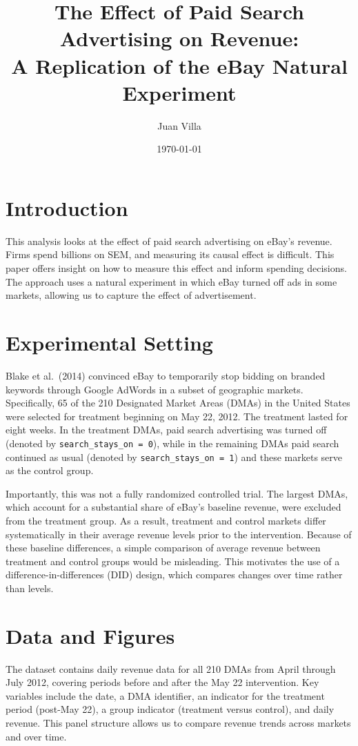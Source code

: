 \documentclass[12pt]{article}
\title{The Effect of Paid Search Advertising on Revenue: \\
A Replication of the eBay Natural Experiment}
\author{Juan Villa}
\date{\today}
\begin{document}
\maketitle

\section{Introduction}

This analysis looks at the effect of paid search advertising on eBay's revenue.
Firms spend billions on SEM, and measuring its causal effect is difficult. This paper offers insight on how to measure this effect and inform spending decisions. 
The approach uses a natural experiment in which eBay turned off ads in some markets, allowing us to capture the effect of advertisement.

\section{Experimental Setting}

Blake et al.\ (2014) convinced eBay to temporarily stop bidding on branded keywords through Google AdWords in a subset of geographic markets. Specifically, 65 of the 210 Designated Market Areas (DMAs) in the United States were selected for treatment beginning on May 22, 2012. The treatment lasted for eight weeks. In the treatment DMAs, paid search advertising was turned off (denoted by \texttt{search\_stays\_on = 0}), while in the remaining DMAs paid search continued as usual (denoted by \texttt{search\_stays\_on = 1}) and these markets serve as the control group.

Importantly, this was not a fully randomized controlled trial. The largest DMAs, which account for a substantial share of eBay's baseline revenue, were excluded from the treatment group. As a result, treatment and control markets differ systematically in their average revenue levels prior to the intervention. Because of these baseline differences, a simple comparison of average revenue between treatment and control groups would be misleading. This motivates the use of a difference-in-differences (DID) design, which compares changes over time rather than levels.

\section{Data and Figures}

The dataset contains daily revenue data for all 210 DMAs from April through July 2012, covering periods before and after the May 22 intervention. Key variables include the date, a DMA identifier, an indicator for the treatment period (post-May 22), a group indicator (treatment versus control), and daily revenue. This panel structure allows us to compare revenue trends across markets and over time.
\end{document}
